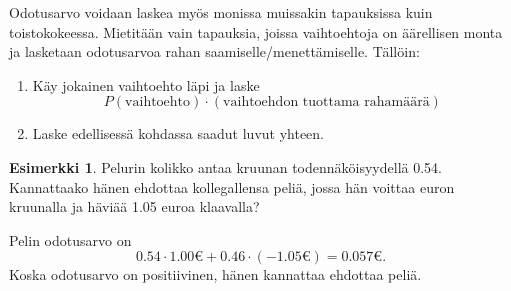 \documentclass[12pt,leqno,a4paper,oneside]{amsart}
\theoremstyle{definition}
\newtheorem{example}[proclaim]{Esimerkki}
\theoremstyle{remark}
\numberwithin{equation}{section}
\begin{document}
% 
% 
% 

Odotusarvo voidaan laskea myös monissa muissakin tapauksissa kuin toistokokeessa. Mietitään vain tapauksia, joissa vaihtoehtoja on äärellisen monta
ja lasketaan odotusarvoa rahan saamiselle/menettämiselle. Tällöin:
\begin{enumerate}
 \item 
 Käy jokainen vaihtoehto läpi ja laske
 $$P(\text{vaihtoehto}) \cdot (\text{vaihtoehdon tuottama rahamäärä})$$
 \item
 Laske edellisessä kohdassa saadut luvut yhteen.
\end{enumerate}

\begin{example}
 Pelurin kolikko antaa kruunan todennäköisyydellä 0.54. Kannattaako hänen ehdottaa kollegallensa peliä, jossa hän voittaa euron kruunalla
 ja häviää 1.05 euroa klaavalla?
 
 Pelin odotusarvo on
 $$0.54\cdot 1.00\text{€} + 0.46\cdot(-1.05\text{€} ) = 0.057\text{€} .$$
 Koska odotusarvo on positiivinen, hänen kannattaa ehdottaa peliä.
\end{example}
\end{document}
